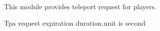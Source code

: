 
This module provides teleport request for players.



Tpa request expiration duration.unit is second

